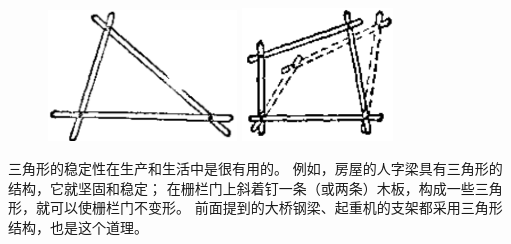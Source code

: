 \begin{figure}[htbp]
    \centering
    \begin{minipage}[b]{7cm}
        \centering
        \includegraphics[width=5cm]{../pic/czjh1-ch3-29.png}
        \caption{}\label{fig:czjh1-3-29}
    \end{minipage}
    \qquad
    \begin{minipage}[b]{7cm}
        \centering
        \includegraphics[width=4cm]{../pic/czjh1-ch3-30.png}
        \caption{}\label{fig:czjh1-3-30}
    \end{minipage}
\end{figure}


三角形的稳定性在生产和生活中是很有用的。
例如，房屋的人字梁具有三角形的结构，它就坚固和稳定；
在栅栏门上斜着钉一条（或两条）木板，构成一些三角形，就可以使栅栏门不变形。
前面提到的大桥钢梁、起重机的支架都采用三角形结构，也是这个道理。


